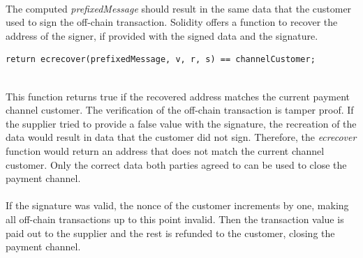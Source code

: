 \leavevmode
\\
The computed \textit{prefixedMessage} should result in the same data that the customer used to sign the off-chain transaction.
Solidity offers a function to recover the address of the signer, if provided with the signed data and the signature.
\\
\begin{lstlisting}[language=Solidity, numbers=none]
return ecrecover(prefixedMessage, v, r, s) == channelCustomer;
\end{lstlisting}
\leavevmode
\\
This function returns true if the recovered address matches the current payment channel customer.
The verification of the off-chain transaction is tamper proof.
If the supplier tried to provide a false value with the signature, the recreation of the data would result in data that the customer did not sign.
Therefore, the \textit{ecrecover} function would return an address that does not match the current channel customer.
Only the correct data both parties agreed to can be used to close the payment channel.
\\\\
If the signature was valid, the nonce of the customer increments by one, making all off-chain transactions up to this point invalid.
Then the transaction value is paid out to the supplier and the rest is refunded to the customer, closing the payment channel.
\newpage
